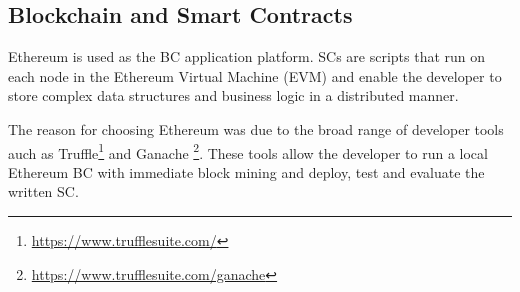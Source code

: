 \subsection{Blockchain and Smart Contracts}
Ethereum is used as the BC application platform. SCs are scripts that run on each node in the Ethereum Virtual Machine (EVM) and enable the developer to store complex data structures and business logic in a distributed manner. 

The reason for choosing Ethereum was due to the broad range of developer tools auch as Truffle\footnote{\url{https://www.trufflesuite.com/}} and Ganache \footnote{\url{https://www.trufflesuite.com/ganache}}. These tools allow the developer to run a local Ethereum BC with immediate block mining and deploy, test and evaluate the written SC. 




